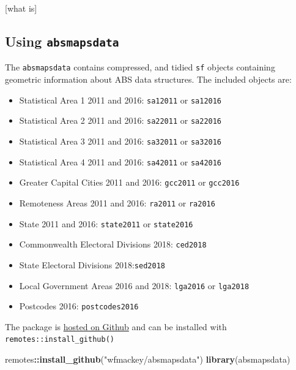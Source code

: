 \documentclass[]{book}
\newenvironment{Shaded}{\begin{snugshade}}{\end{snugshade}}
\newcommand{\KeywordTok}[1]{\textcolor[rgb]{0.13,0.29,0.53}{\textbf{#1}}}
\newcommand{\NormalTok}[1]{#1}
\newcommand{\OperatorTok}[1]{\textcolor[rgb]{0.81,0.36,0.00}{\textbf{#1}}}
\newcommand{\StringTok}[1]{\textcolor[rgb]{0.31,0.60,0.02}{#1}}
\providecommand{\tightlist}{%
  \setlength{\itemsep}{0pt}\setlength{\parskip}{0pt}}
\begin{document}
{[}what is{]}

\hypertarget{using-absmapsdata}{%
\subsection{\texorpdfstring{Using \texttt{absmapsdata}}{Using absmapsdata}}\label{using-absmapsdata}}

The \texttt{absmapsdata} contains compressed, and tidied \texttt{sf} objects containing geometric information about ABS data structures. The included objects are:

\begin{itemize}
\tightlist
\item
  Statistical Area 1 2011 and 2016: \texttt{sa12011} or \texttt{sa12016}
\item
  Statistical Area 2 2011 and 2016: \texttt{sa22011} or \texttt{sa22016}
\item
  Statistical Area 3 2011 and 2016: \texttt{sa32011} or \texttt{sa32016}
\item
  Statistical Area 4 2011 and 2016: \texttt{sa42011} or \texttt{sa42016}
\item
  Greater Capital Cities 2011 and 2016: \texttt{gcc2011} or \texttt{gcc2016}
\item
  Remoteness Areas 2011 and 2016: \texttt{ra2011} or \texttt{ra2016}
\item
  State 2011 and 2016: \texttt{state2011} or \texttt{state2016}
\item
  Commonwealth Electoral Divisions 2018: \texttt{ced2018}
\item
  State Electoral Divisions 2018:\texttt{sed2018}
\item
  Local Government Areas 2016 and 2018: \texttt{lga2016} or \texttt{lga2018}
\item
  Postcodes 2016: \texttt{postcodes2016}
\end{itemize}

The package is \href{https://github.com/wfmackey/absmapsdata}{hosted on Github} and can be installed with \texttt{remotes::install\_github()}

\begin{Shaded}
\begin{Highlighting}[]
\NormalTok{remotes}\OperatorTok{::}\KeywordTok{install_github}\NormalTok{(}\StringTok{"wfmackey/absmapsdata"}\NormalTok{)}
\KeywordTok{library}\NormalTok{(absmapsdata)}
\end{Highlighting}
\end{Shaded}
\end{document}
